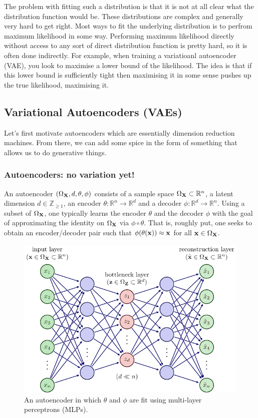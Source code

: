 \documentclass[11pt]{article}
\begin{document}
The problem with fitting such a distribution is that it is not at all clear what the distribution function would be. These distributions are complex and generally very hard to get right. Most ways to fit the underlying distribution is to perfrom maximum likelihood in some way. Performing maximum likelihood directly without access to any sort of direct distribution function is pretty hard, so it is often done indirectly. For example, when training a variatioanl autoencoder (VAE), you look to maximise a lower bound of the likelihood. The idea is that if this lower bound is sufficiently tight then maximising it in some sense pushes up the true likelihood, maximising it.

\subsection{Variational Autoencoders (VAEs)}
 Let's first motivate autoencoders which are essentially dimension reduction machines. From there, we can add some spice in the form of something that allows us to do generative things.

\subsubsection{Autoencoders: no variation yet!}
\label{sec:autoencoders}
An autoencoder $(\Omega_{\mathbf{X}},d,\theta,\phi)$ consists of a sample space $\Omega_{\mathbf{X}}\subset\mathbb{R}^n$, a latent dimension $d\in\mathbb{Z}_{\geq1}$, an encoder $\theta:\mathbb{R}^n\to\mathbb{R}^d$ and a decoder $\phi:\mathbb{R}^d\to\mathbb{R}^n$. Using a subset of $\Omega_{\mathbf{X}}$, one typically learns the encoder $\theta$ and the decoder $\phi$ with the goal of approximating the identity on $\Omega_{\mathbf{X}}$ via $\phi\circ \theta$. That is, roughly put, one seeks to obtain an encoder/decoder pair such that $\phi(\theta(\mathbf{x}))\approx\mathbf{x}$ for all $\mathbf{x}\in\Omega_{\mathbf{X}}$.

\begin{figure}[t]
    \centering
    \includegraphics{./figures/neural_nets/AE_autoencoder.pdf}
    \caption{An autoencoder in which $\theta$ and $\phi$ are fit using multi-layer perceptrons (MLPs).}
    \label{fig:autoencoder}
\end{figure}
\end{document}
